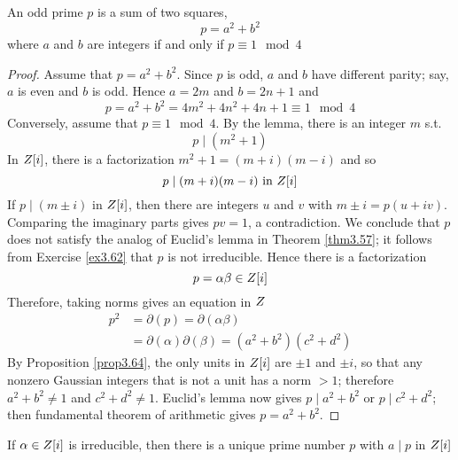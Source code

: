 \documentclass[11pt]{article}
\begin{document}
\begin{theorem}
\label{thm3.66}
An odd prime \(p\) is a sum of two squares,
\begin{equation*}
p=a^2+b^2
\end{equation*}
where \(a\) and \(b\) are integers if and only if \(p\equiv 1\mod 4\)
\end{theorem}

\begin{proof}
Assume that \(p=a^2+b^2\). Since \(p\) is odd, \(a\) and \(b\) have different
parity; say, \(a\) is even and \(b\) is odd. Hence \(a=2m\) and \(b=2n+1\) and
\begin{equation*}
p=a^2+b^2=4m^2+4n^2+4n+1\equiv1\mod 4
\end{equation*}
Conversely, assume that \(p\equiv1\mod4\). By the lemma, there is an integer
\(m\) s.t.
\begin{equation*}
p\mid(m^2+1)
\end{equation*}
In \(\relax{Z}[i]\), there is a factorization \(m^2+1=(m+i)(m-i)\) and so 
\begin{equation*}
p\mid(m+i)(m-i) \text{ in }\relax{Z}[i]
\end{equation*}
If \(p\mid(m\pm i)\) in \(\relax{Z}[i]\), then there are integers \(u\) and \(v\) with
\(m\pm i=p(u+iv)\). Comparing the imaginary parts gives \(pv=1\), a
contradiction. We conclude that \(p\) does not satisfy the analog of Euclid's
lemma in Theorem \ref{thm3.57}; it follows from Exercise \ref{ex3.62} that  \(p\)
is not irreducible. Hence there is a factorization
\begin{equation*}
p=\alpha\beta\in\relax{Z}[i]
\end{equation*}
Therefore, taking norms gives an equation in \(\relax{Z}\)
\begin{align*}
p^2&=\partial(p)=\partial(\alpha\beta)\\
&=\partial(\alpha)\partial(\beta)=(a^2+b^2)(c^2+d^2)
\end{align*}
By Proposition \ref{prop3.64}, the only units in \(\relax{Z}[i]\) are \(\pm1\) and
\(\pm i\), so that any nonzero Gaussian integers that is not a unit has a norm
\(>1\); therefore \(a^2+b^2\neq1\) and \(c^2+d^2\neq1\). Euclid's lemma now
gives \(p\mid a^2+b^2\)  or \(p\mid c^2+d^2\); then fundamental theorem of arithmetic
gives \(p=a^2+b^2\).
\end{proof}

\begin{lemma}[]
\label{lemma3.67}
If \(\alpha\in\relax{Z}[i]\) is irreducible, then there is a unique prime number \(p\)
with \(a\mid p\) in \(\relax{Z}[i]\)
\end{lemma}
\end{document}
